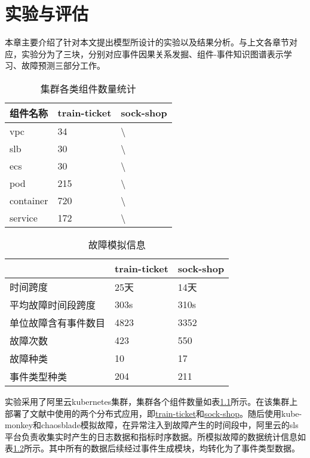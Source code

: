 \chapter{实验与评估}
本章主要介绍了针对本文提出模型所设计的实验以及结果分析。与上文各章节对应，实验分为了三块，分别对应事件因果关系发掘、组件-事件知识图谱表示学习、故障预测三部分工作。
\begin{table}[htbp]
    \caption{集群各类组件数量统计}
    \label{component-num}
    \centering
    \begin{tabular}{lll}
    \hline
    组件名称      & train-ticket & sock-shop        \\ \hline
    vpc       & 34           & \textbackslash{} \\
    slb       & 30           & \textbackslash{} \\
    ecs       & 30           & \textbackslash{} \\
    pod       & 215          & \textbackslash{} \\
    container & 720          & \textbackslash{} \\
    service   & 172          & \textbackslash{} \\ \hline
    \end{tabular}
\end{table}

\begin{table}[htbp]
    \caption{故障模拟信息}
    \centering
    \label{failure-simulation-info}
    \begin{tabular}{lll}
    \hline
               & train-ticket & \multicolumn{1}{c}{sock-shop} \\ \hline
    时间跨度       & 25天          & 14天                           \\
    平均故障时间段跨度  & 303s         & 310s                          \\
    单位故障含有事件数目 & 4823         & 3352                          \\
    故障次数       & 423          & 550                           \\
    故障种类       & 10           & 17                            \\
    事件类型种类     & 204          & 211                           \\ \hline
    \end{tabular}
\end{table}

实验采用了阿里云kubernetes集群，集群各个组件数量如表\ref{component-num}所示。在该集群上部署了文献\parencite{}中使用的两个分布式应用，即\href{https://github.com/FudanSELab/train-ticket}{train-ticket}和\href{https://github.com/microservices-demo/microservices-demo}{sock-shop}。随后使用kube-monkey和chaosblade模拟故障，在异常注入到故障产生的时间段中，阿里云的sls平台负责收集实时产生的日志数据和指标时序数据。所模拟故障的数据统计信息如表\ref{failure-simulation-info}所示。其中所有的数据后续经过事件生成模块，均转化为了事件类型数据。


